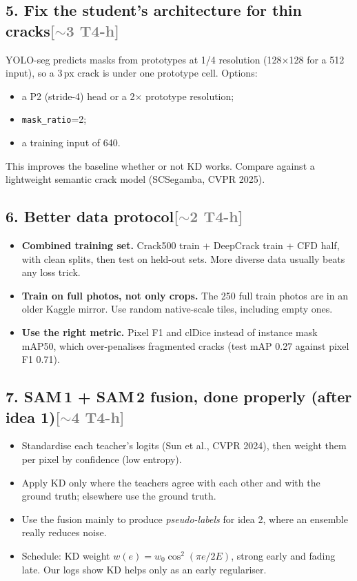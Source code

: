 \documentclass[11pt,a4paper]{article}
\newcommand{\cost}[1]{\hfill\textcolor{gray}{\small[#1]}}
\begin{document}
\subsection*{5. Fix the student's architecture for thin cracks\cost{$\sim$3 T4-h}}
YOLO-seg predicts masks from prototypes at 1/4 resolution (128$\times$128 for a 512 input), so a 3\,px crack is under one prototype cell.
Options:
\begin{itemize}
\item a P2 (stride-4) head or a 2$\times$ prototype resolution;
\item \texttt{mask\_ratio}=2;
\item a training input of 640.
\end{itemize}
This improves the baseline whether or not KD works. Compare against a lightweight semantic crack model (SCSegamba, CVPR 2025).

\subsection*{6. Better data protocol\cost{$\sim$2 T4-h}}
\begin{itemize}
\item \textbf{Combined training set.} Crack500 train + DeepCrack train + CFD half, with clean splits, then test on held-out sets. More diverse data usually beats any loss trick.
\item \textbf{Train on full photos, not only crops.} The 250 full train photos are in an older Kaggle mirror. Use random native-scale tiles, including empty ones.
\item \textbf{Use the right metric.} Pixel F1 and clDice instead of instance mask mAP50, which over-penalises fragmented cracks (test mAP 0.27 against pixel F1 0.71).
\end{itemize}

\subsection*{7. SAM\,1 + SAM\,2 fusion, done properly (after idea 1)\cost{$\sim$4 T4-h}}
\begin{itemize}
\item Standardise each teacher's logits (Sun et al., CVPR 2024), then weight them per pixel by confidence (low entropy).
\item Apply KD only where the teachers agree with each other and with the ground truth; elsewhere use the ground truth.
\item Use the fusion mainly to produce \emph{pseudo-labels} for idea 2, where an ensemble really reduces noise.
\item Schedule: KD weight $w(e)=w_0\cos^2(\pi e/2E)$, strong early and fading late. Our logs show KD helps only as an early regulariser.
\end{itemize}
\end{document}
